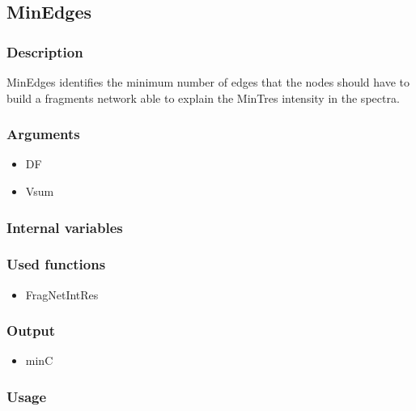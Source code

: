 \subsection{MinEdges}\label{MinEdges}
\subsubsection{Description}
MinEdges identifies the minimum number of edges that the nodes should have to build a fragments network able to explain the MinTres intensity in the spectra.
\subsubsection{Arguments}
\begin{itemize}
\item DF
\item Vsum
\end{itemize}
\subsubsection{Internal variables}
\subsubsection{Used functions}
\begin{itemize}
\item FragNetIntRes
\end{itemize}
\subsubsection{Output}
\begin{itemize}
\item minC
\end{itemize}
\subsubsection{Usage}

